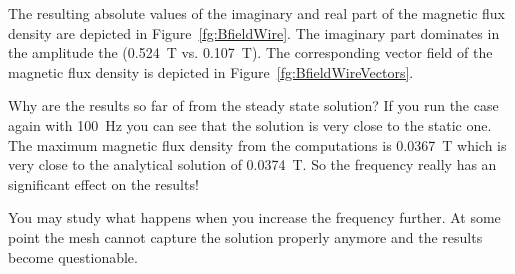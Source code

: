 The resulting absolute values of the imaginary and real part of the magnetic flux density are depicted in
Figure~\ref{fg:BfieldWire}. The imaginary part dominates in the amplitude the (0.524~T vs. 0.107~T). 
The corresponding vector field of the magnetic flux density is depicted in Figure~\ref{fg:BfieldWireVectors}.

Why are the results so far of from the steady state solution? If you run the case again with 
100~Hz you can see that the solution is very close to the static one. The maximum magnetic flux density from the
computations is 0.0367~T which is very close to the analytical solution of 0.0374~T. So the frequency
really has an significant effect on the results!

You may study what happens when you increase the frequency further. At some point the mesh cannot capture the solution
properly anymore and the results become questionable.


\hfill



